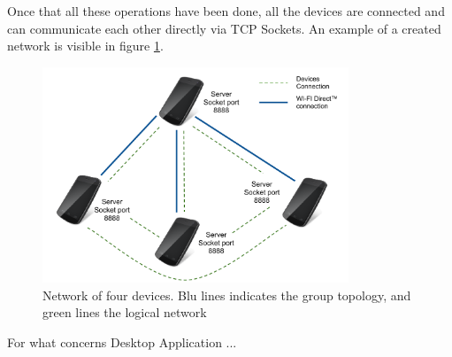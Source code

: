 Once that all these operations have been done, all the devices are connected and can communicate each other directly via TCP Sockets. An example of a created network is visible in figure \ref{fig:device_network}.

\begin{figure}[!htbp]
\centering
\includegraphics[width=3.6in]{imgs/Devices_network.pdf}
\caption{Network of four devices. Blu lines indicates the \direct group topology, and green lines the logical network}
\label{fig:device_network}
\end{figure}

For what concerns Desktop Application ...
